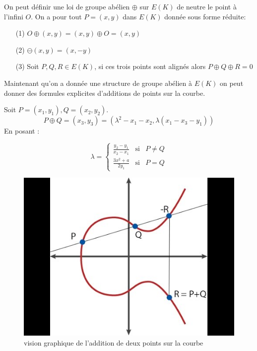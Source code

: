\documentclass{article}
\begin{document}
On peut définir une loi de groupe abélien $\oplus$ sur $E(K)$ de neutre le point à l'infini $O$. On a pour tout $P = (x,y) $ dans $E(K)$ donnée sous forme réduite:
\begin{itemize}
\item[(1)] $O \oplus (x,y) = (x,y) \oplus O = (x,y)$
\item[(2)] $\ominus (x,y) = (x, -y)$
\item[(3)] Soit $P,Q,R \in E(K)$, si ces trois points sont alignés alors $P \oplus Q \oplus R = 0$
\end{itemize}

Maintenant qu'on a donnée une structure de groupe abélien à $E(K)$ on peut donner des formules explicites d'additions de points sur la courbe.

\begin{prop}
Soit $P =(x_1, y_1), Q=(x_2, y_2)$.
$$P \oplus Q = (x_3, y_3) = (\lambda^2 -x_1 -x_2, \lambda(x_1 - x_3 - y_1)) $$
En posant : 

\begin{equation}
\lambda =
\left\lbrace
\begin{array}{ccc}
\frac{y_2 - y_1}{x_2 - x_1} & \mbox{si} & P \ne Q  \\
\frac{3x^2 + a}{2y_1} & \mbox{si}  & P = Q
\end{array}\right.
\end{equation}
\end{prop}
\newpage
\begin{figure}[h!]
\includegraphics[scale=0.7]{pictures/hqdefault.jpg} 
\caption{vision graphique de l'addition de deux points sur la courbe}
\end{figure}
\end{document}
